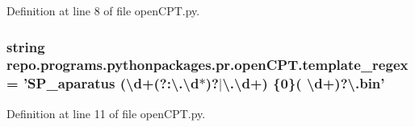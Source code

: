 Definition at line 8 of file open\-C\-P\-T.\-py.

\hypertarget{namespacerepo_1_1programs_1_1pythonpackages_1_1pr_1_1openCPT_a87910852db48cafc314ea9372f00a401}{
\subsubsection[{template\-\_\-regex}]{\setlength{\rightskip}{0pt plus 5cm}string repo.\-programs.\-pythonpackages.\-pr.\-open\-C\-P\-T.\-template\-\_\-regex = 'S\-P\-\_\-aparatus (\textbackslash{}d+(?\-:\textbackslash{}.\textbackslash{}d$\ast$)?$\vert$\textbackslash{}.\textbackslash{}d+) \{0\}( \textbackslash{}d+)?\textbackslash{}.bin'}}\label{namespacerepo_1_1programs_1_1pythonpackages_1_1pr_1_1openCPT_a87910852db48cafc314ea9372f00a401}


Definition at line 11 of file open\-C\-P\-T.\-py.

